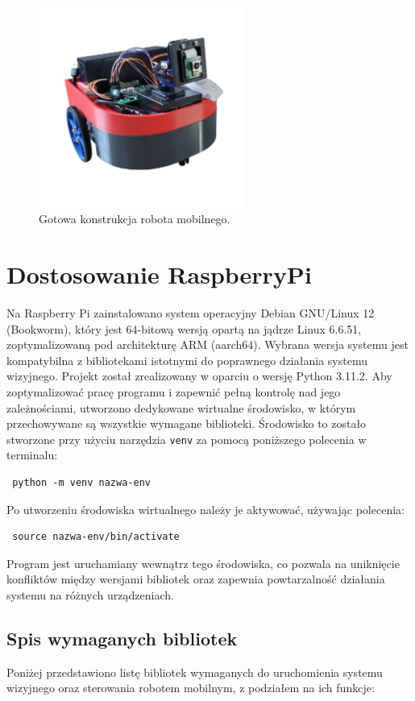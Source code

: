 \documentclass[a4paper,twoside,12pt]{book}
\begin{document}
\begin{figure}[h]
    \centering
    \includegraphics[width=0.6\textwidth]{Images/Robot/Robot_gotowy.png}
    \caption{Gotowa konstrukcja robota mobilnego.}
    \label{fig:Robot_gotowy}
\end{figure}

\section{Dostosowanie RaspberryPi}
Na Raspberry Pi zainstalowano system operacyjny Debian GNU/Linux 12 (Bookworm), który jest 64-bitową wersją opartą na jądrze Linux 6.6.51, zoptymalizowaną pod architekturę ARM (aarch64). Wybrana wersja systemu jest kompatybilna z bibliotekami istotnymi do poprawnego działania systemu wizyjnego. Projekt został zrealizowany w oparciu o wersję Python 3.11.2. Aby zoptymalizować pracę programu i zapewnić pełną kontrolę nad jego zależnościami, utworzono dedykowane wirtualne środowisko, w którym przechowywane są wszystkie wymagane biblioteki. Środowisko to zostało stworzone przy użyciu narzędzia \texttt{venv} za pomocą poniższego polecenia w terminalu: \begin{verbatim} python -m venv nazwa-env \end{verbatim} Po utworzeniu środowiska wirtualnego należy je aktywować, używając polecenia: \begin{verbatim} source nazwa-env/bin/activate \end{verbatim} Program jest uruchamiany wewnątrz tego środowiska, co pozwala na uniknięcie konfliktów między wersjami bibliotek oraz zapewnia powtarzalność działania systemu na różnych urządzeniach.

\newpage
\subsection{Spis wymaganych bibliotek}
Poniżej przedstawiono listę bibliotek wymaganych do uruchomienia systemu wizyjnego oraz sterowania robotem mobilnym, z podziałem na ich funkcje:
\end{document}
